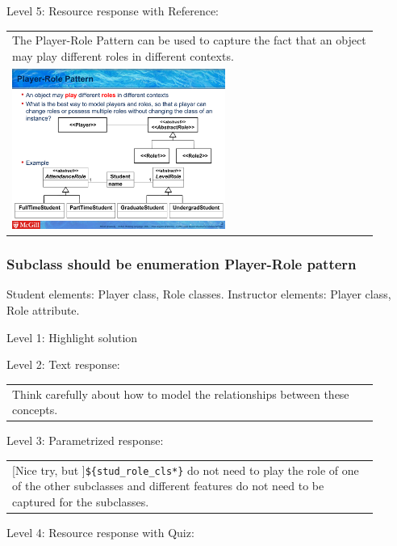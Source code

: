 \noindent Level 5: Resource response with Reference: \medskip

\begin{tabular}{|p{0.9\linewidth}}
The Player-Role Pattern can be used to capture the fact that an object may play different roles
in different contexts.

\\
\includegraphics[width=0.6\textwidth]{images/player_role.png}
\end{tabular} \medskip


\subsubsection{Subclass should be enumeration Player-Role pattern}

Student elements: Player class, Role classes. Instructor elements: Player class, Role attribute. \medskip

\noindent Level 1: Highlight solution  \medskip

\noindent Level 2: Text response: \medskip

\begin{tabular}{|p{0.9\linewidth}}
Think carefully about how to model the relationships between these concepts.
\end{tabular} \medskip

\noindent Level 3: Parametrized response: \medskip

\begin{tabular}{|p{0.9\linewidth}}
[Nice try, but ]\verb|${stud_role_cls*}| do not need to play the role of one of the other subclasses and different features do not need to be captured for the subclasses.
\end{tabular} \medskip

\noindent Level 4: Resource response with Quiz: \medskip


